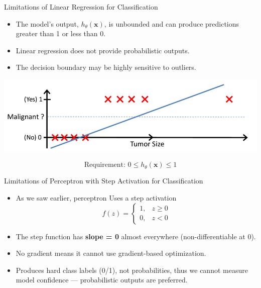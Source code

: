 \documentclass[serif, aspectratio=169]{beamer}
\begin{document}
\begin{frame}{Limitations of Linear Regression for Classification}
    \begin{itemize}
        \item The model's output, $h_\theta(\mathbf{x})$, is unbounded and can produce predictions greater than 1 or less than 0.
        \item Linear regression does not provide probabilistic outputs.
        \item The decision boundary may be highly sensitive to outliers.
    \end{itemize}

    \vspace{0.5em}
    \centering
    \includegraphics[width=0.68\linewidth]{pic/lrClassification2.png}

    \[
        \text{Requirement: } 0 \le h_\theta(\mathbf{x}) \le 1
    \]

\end{frame}

\begin{frame}{Limitations of Perceptron with Step Activation for Classification}
    \begin{itemize}
        \item As we saw earlier, perceptron Uses a step activation 
        \[
            f(z) =
            \begin{cases}
                1, & z \ge 0\\
                0, & z < 0
            \end{cases}
        \]
        \item The step function has \textbf{slope = 0} almost everywhere (non-differentiable at 0).
        \item No gradient means it cannot use gradient-based optimization.
        \item Produces hard class labels (0/1), not probabilities, thus we cannot measure model confidence — probabilistic outputs are preferred.

    \end{itemize}
\end{frame}
\end{document}
